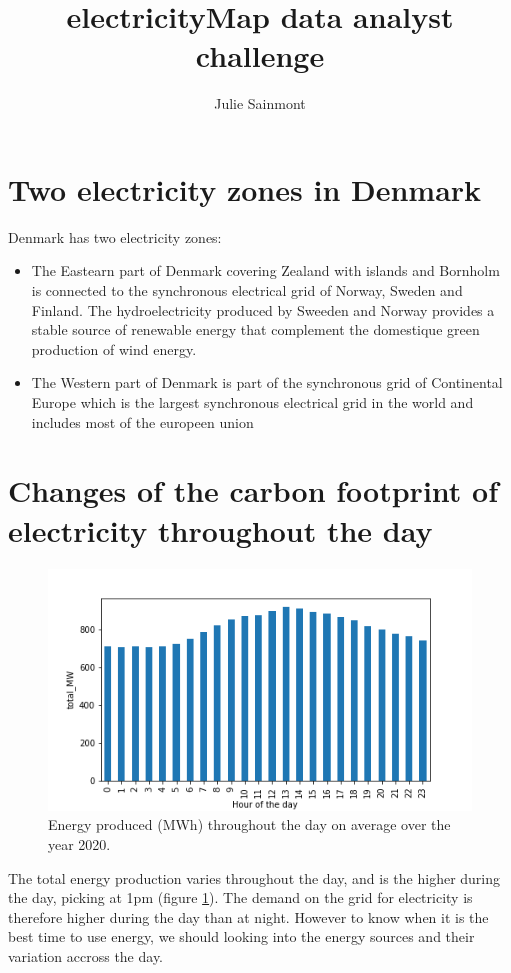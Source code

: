 \documentclass[11pt]{article} %
\title{electricityMap data analyst challenge}
\author{Julie Sainmont}
\begin{document}
\maketitle

\section{Two electricity zones in Denmark}

Denmark has two electricity zones:
\begin{itemize}
\item The Eastearn part of Denmark covering Zealand with islands and Bornholm is connected to the synchronous electrical grid of Norway, Sweden and Finland. The hydroelectricity produced by Sweeden and Norway provides a stable source of renewable energy that complement the domestique green production of wind energy.
\item The Western part of Denmark is part of the synchronous grid of Continental Europe which is the largest  synchronous electrical grid in the world and includes most of the europeen union
\end{itemize}

\section{Changes of the carbon footprint of electricity throughout the day}
\begin{figure}
  \includegraphics[width=0.8\linewidth]{../outputs/total_MW.png}
  \caption{Energy produced (MWh) throughout the day on average over the year 2020.}
  \label{fig:total_kwh}
\end{figure}
The total energy production varies throughout the day, and is the higher during the day, picking at 1pm (figure \ref{fig:total_kwh}). The demand on the grid for electricity is therefore higher during the day than at night. However to know when it is the best time to use energy, we should looking into the energy sources and their variation accross the day.\\
\end{document}
